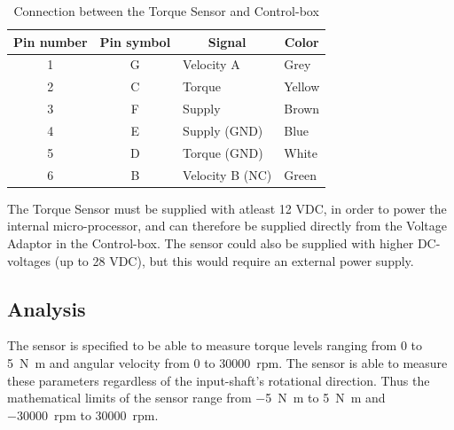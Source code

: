 \begin{table}[h]
	\centering
	\label{my-label}
	\begin{tabular}{|c|c|l|l|}
		\hline
		\textbf{Pin number} & \textbf{Pin symbol} & \multicolumn{1}{c|}{\textbf{Signal}} & \multicolumn{1}{c|}{\textbf{Color}} \\ \hline
		1                   & G                   & Velocity A                           & Grey                                \\ \hline
		2                   & C                   & Torque                               & Yellow                              \\ \hline
		3                   & F                   & Supply		                         & Brown                               \\ \hline
		4                   & E                   & Supply (GND)                         & Blue                                \\ \hline
		5                   & D                   & Torque (GND)                         & White                               \\ \hline
		6                   & B                   & Velocity B (NC)                      & Green                               \\ \hline
	\end{tabular}
	\caption{Connection between the Torque Sensor and Control-box}
\end{table}

The Torque Sensor must be supplied with atleast 12 VDC, in order to power the internal micro-processor, and can therefore be supplied directly from the Voltage Adaptor in the Control-box. The sensor could also be supplied with higher DC-voltages (up to 28 VDC), but this would require an external power supply.

\subsection{Analysis}
The sensor is specified to be able to measure torque levels ranging from 0 to \SI{5}{\newton \meter} and angular velocity from 0 to \SI{30000}{rpm}\cite{TorqueSensor}. The sensor is able to measure these parameters regardless of the input-shaft's rotational direction. Thus the mathematical limits of the sensor range from \SI{-5}{\newton \meter} to \SI{+5}{\newton \meter} and \SI{-30000}{rpm} to \SI{+30000}{rpm}.

